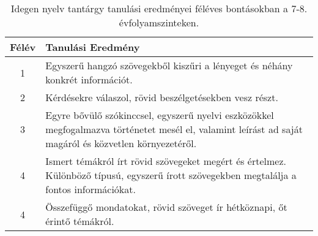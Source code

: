        
           \begin{longtable}{c | p{} }
            \caption[Idegen nyelv 7-8.]{Idegen nyelv tantárgy tanulási eredményei féléves bontásokban a 7-8. évfolyamszinteken. }  \\

            \textbf{Félév} & \textbf{Tanulási Eredmény} \\
            \hline
            \endhead
                                
                              
                                          1 &  Egyszerű hangzó szövegekből kiszűri a lényeget és néhány konkrét információt. \\ \hline
                                          2 &  Kérdésekre válaszol, rövid beszélgetésekben vesz részt. \\ \hline
                                          3 &  Egyre bővülő szókinccsel, egyszerű nyelvi eszközökkel megfogalmazva történetet mesél el, valamint leírást ad saját magáról és közvetlen környezetéről. \\ \hline
                                          4 &  Ismert témákról írt rövid szövegeket megért és értelmez. Különböző típusú, egyszerű írott szövegekben megtalálja a fontos információkat. \\ \hline
                                          4 &  Összefüggő mondatokat, rövid szöveget ír hétköznapi, őt érintő témákról. \\ \hline
                                      
                        \end{longtable}
            \clearpage

